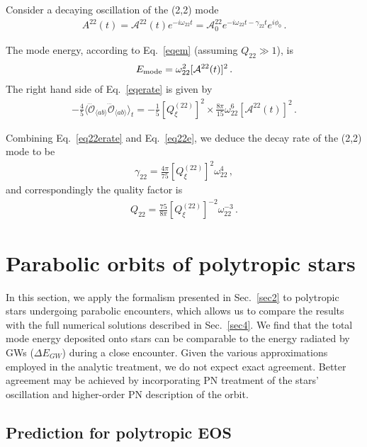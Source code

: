 \documentclass[prd,aps,floatfix,superscriptaddress,nofootinbib,twocolumn,10pt,English]{revtex4}
\begin{document}
Consider a decaying oscillation of the (2,2) mode
\begin{align}
A^{22}(t) = \mathcal{A}^{22}(t) e^{- i \omega_{22} t} = \mathcal{A}^{22}_0 e^{-i \omega_{22} t-\gamma_{22} t} e^{i \phi_0}\,.
\end{align}

The mode energy, according to Eq.~\eqref{eqem} (assuming $Q_{22} \gg 1$), is
\begin{align}\label{eq22e}
E_{\rm mode} = \omega^2_{22} [\mathcal{A}^{22}(t)]^2\,.
\end{align}
The right hand side of Eq.~\eqref{eqerate} is given by
\begin{align}\label{eq22erate}
 -\frac{4}{5} \langle \dddot{\mathcal{O}}_{\langle ab \rangle}  \dddot{\mathcal{O}}_{\langle ab \rangle} \rangle_t = -\frac{1}{5} [Q^{(22)}_\xi]^2\times \frac{8 \pi}{15}  \omega^6_{22} [\mathcal{A}^{22}(t)]^2\,.
   \end{align}

Combining Eq.~\eqref{eq22erate} and Eq.~\eqref{eq22e}, we deduce the decay rate of the (2,2) mode to be
\begin{align}
\gamma_{22} = \frac{4 \pi}{75}  [Q^{(22)}_\xi]^2 \omega_{22}^4\,,
\end{align}
and correspondingly the quality factor is
\begin{align}\label{eqquality}
Q_{22} = \frac{75}{8 \pi}  [Q^{(22)}_\xi]^{-2} \omega_{22}^{-3}\,.
\end{align}


\section{Parabolic orbits of polytropic stars }\label{sec3}

In this section, we apply the formalism presented in Sec.~\ref{sec2} to
polytropic stars undergoing parabolic encounters,  which allows us to compare the results
with the full numerical solutions described in Sec.~\ref{sec4}. We find that the
total mode energy deposited onto stars can be comparable to the  energy radiated
by GWs ($\Delta E_{GW}$) during a close encounter. %
Given the various approximations employed in the analytic treatment, we do not
expect exact agreement. Better agreement may be achieved by incorporating PN treatment of the stars' oscillation and higher-order PN description of the orbit.

\subsection{Prediction for polytropic EOS}
\end{document}
